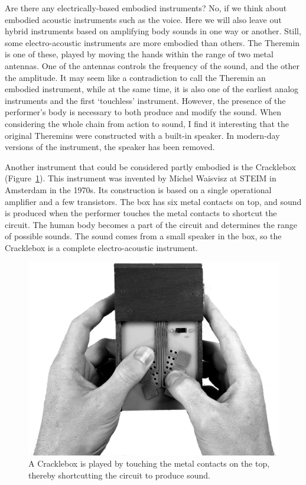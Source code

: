 Are there any electrically-based embodied instruments? No, if we think about embodied acoustic instruments such as the voice. Here we will also leave out hybrid instruments based on amplifying body sounds in one way or another. Still, some electro-acoustic instruments are more embodied than others.
The Theremin is one of these, played by moving the hands within the range of two metal antennas. One of the antennas controls the frequency of the sound, and the other the amplitude. It may seem like a contradiction to call the Theremin an embodied instrument, while at the same time, it is also one of the earliest analog instruments and the first `touchless' instrument. However, the presence of the performer's body is necessary to both produce and modify the sound. When considering the whole chain from action to sound, I find it interesting that the original Theremins were constructed with a built-in speaker. In modern-day versions of the instrument, the speaker has been removed.

Another instrument that could be considered partly embodied is the Cracklebox (Figure~\ref{fig:Cracklebox}). This instrument was invented by Michel Waisvisz at STEIM in Amsterdam in the 1970s. Its construction is based on a single operational amplifier and a few transistors. The box has six metal contacts on top, and sound is produced when the performer touches the metal contacts to shortcut the circuit. The human body becomes a part of the circuit and determines the range of possible sounds. The sound comes from a small speaker in the box, so the Cracklebox is a complete electro-acoustic instrument.

\begin{figure}[tbp]
	\centering
		\includegraphics[width=0.7\columnwidth]{figures/50-cracklebox.jpg}
	\caption{A Cracklebox is played by touching the metal contacts on the top, thereby shortcutting the circuit to produce sound.}
	\label{fig:Cracklebox}
\end{figure}

